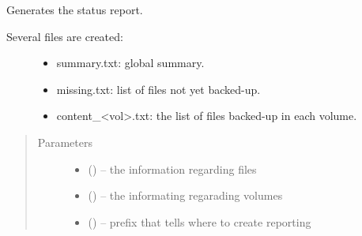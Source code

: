 \documentclass[letterpaper,10pt,english]{sphinxmanual}
\begin{document}
\begin{fulllineitems}
\label{\detokenize{index:fsbackup.commands.backupStatus}}
Generates the status report.
\begin{description}
\item[{Several files are created:}] \leavevmode\begin{itemize}
\item {} 
summary.txt: global summary.

\item {} 
missing.txt: list of files not yet backed-up.

\item {} 
content\_\textless{}vol\textgreater{}.txt: the list of files backed-up in each volume.

\end{itemize}

\end{description}
\begin{quote}\begin{description}
\item[{Parameters}] \leavevmode\begin{itemize}
\item {} 
 ({\hyperref[\detokenize{index:fsbackup.fileDB.FileDB}]{}}) -- the information regarding files

\item {} 
 () -- the informating regarading volumes

\item {} 
 () -- prefix that tells where to create reporting

\end{itemize}

\end{description}\end{quote}

\end{fulllineitems}

\end{document}
